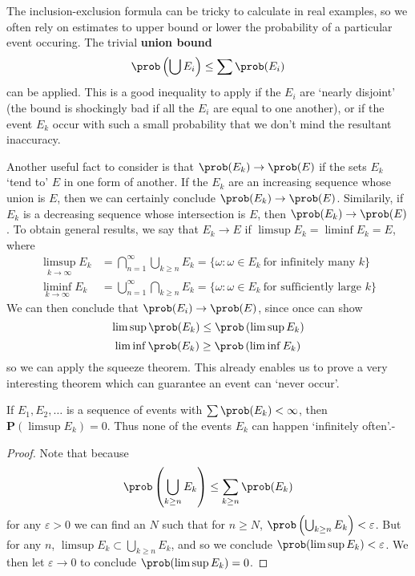 The inclusion-exclusion formula can be tricky to calculate in real examples, so we often rely on estimates to upper bound or lower the probability of a particular event occuring. The trivial {\bf union bound}
%
\[ \prob \left( \bigcup E_i \right) \leq \sum \prob(E_i) \]
%
can be applied. This is a good inequality to apply if the $E_i$ are `nearly disjoint' (the bound is shockingly bad if all the $E_i$ are equal to one another), or if the event $E_k$ occur with such a small probability that we don't mind the resultant inaccuracy.

Another useful fact to consider is that $\prob(E_k) \to \prob(E)$ if the sets $E_k$ `tend to' $E$ in one form of another. If the $E_k$ are an increasing sequence whose union is $E$, then we can certainly conclude $\prob(E_k) \to \prob(E)$. Similarily, if $E_k$ is a decreasing sequence whose intersection is $E$, then $\prob(E_k) \to \prob(E)$. To obtain general results, we say that $E_k \to E$ if $\limsup E_k = \liminf E_k = E$, where
%
\begin{align*}
    \limsup_{k \to \infty} E_k &= \bigcap_{n = 1}^\infty \bigcup_{k \geq n} E_k = \{ \omega : \omega \in E_k\ \text{for infinitely many $k$} \}\\
    \liminf_{k \to \infty} E_k &= \bigcup_{n = 1}^\infty \bigcap_{k \geq n} E_k = \{ \omega: \omega \in E_k\ \text{for sufficiently large $k$} \}
\end{align*}
%
We can then conclude that $\prob(E_i) \to \prob(E)$, since once can show
%
\[ \limsup \prob(E_k) \leq \prob \left( \limsup E_k \right) \]
\[ \liminf \prob(E_k) \geq \prob \left( \liminf E_k \right) \]
%
so we can apply the squeeze theorem. This already enables us to prove a very interesting theorem which can guarantee an event can `never occur'.

\begin{lemma}
    If $E_1, E_2, \dots$ is a sequence of events with $\sum \prob(E_k) < \infty$, then $\mathbf{P} \left( \limsup E_k \right) = 0$. Thus none of the events $E_k$ can happen `infinitely often'.-
\end{lemma}
\begin{proof}
    Note that because
    \[ \prob \left( \bigcup_{k \geq n} E_k \right) \leq \sum_{k \geq n} \prob(E_k) \]
    for any $\varepsilon > 0$ we can find an $N$ such that for $n \geq N$, $\prob \left( \bigcup_{k \geq n} E_k \right) < \varepsilon$. But for any $n$, $\limsup E_k \subset \bigcup_{k \geq n} E_k$, and so we conclude $\prob(\limsup E_k) < \varepsilon$. We then let $\varepsilon \to 0$ to conclude $\prob(\limsup E_k) = 0$.
\end{proof}

